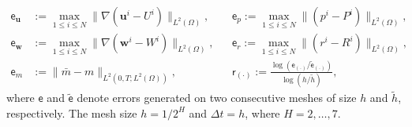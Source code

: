\documentclass{amsart}
\begin{document}
%
\begin{align*}
	\mathsf{e}_{\boldsymbol{u}}&:= \max_{1\le i\le N}\|\nabla(\boldsymbol{u}^i-U^i)\|_{L^2(\Omega)}, && \mathsf{e}_{p}:= \max_{1\le i\le N}\|(p^i-P^i)\|_{L^2(\Omega)}, 
    \\
	\mathsf{e}_{\boldsymbol{w}}&:= \max_{1\le i\le N}\|\nabla(\boldsymbol{w}^i-W^i)\|_{L^2(\Omega)}, && \mathsf{e}_{r}:= \max_{1\le i\le N}\|(r^i-R^i)\|_{L^2(\Omega)}, 
    \\
    \mathsf{e}_{m}&:= \|\bar{m}-m\|_{L^2(0,T; L^2(\Omega))}, &&
    \mathsf{r}_{(\cdot)} := \frac{\log\left(\mathsf{e}_{(\cdot)}/\tilde{\mathsf{e}}_{(\cdot)}\right)}{\log\left(h/\tilde{h}\right)},
\end{align*}
%
where $\mathsf{e}$ and $\tilde{\mathsf{e}}$ denote errors generated on two consecutive meshes of size $h$ and $\tilde{h}$, respectively. The mesh size $h=1/2^H$ and $\Delta t = h$, where $H= 2,\ldots,7$.
\end{document}
